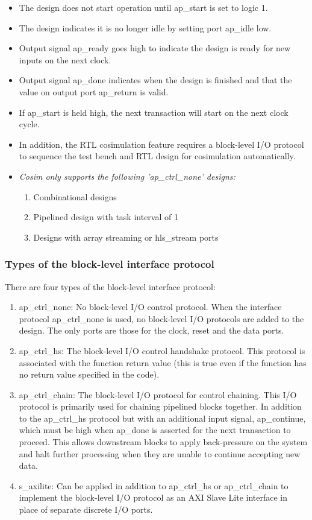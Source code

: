 \begin{itemize}
    \item The design does not start operation until ap\_start is set to logic 1.
    \item The design indicates it is no longer idle by setting port ap\_idle low.
    \item Output signal ap\_ready goes high to indicate the design is ready for new inputs on the next clock.
    \item Output signal ap\_done indicates when the design is finished and that the value on output port ap\_return is valid.
    \item If ap\_start is held high, the next transaction will start on the next clock cycle.
    \item In addition, the RTL cosimulation feature requires a block-level I/O protocol to sequence the test bench and RTL design for cosimulation automatically.
    \item {\it Cosim only supports the following 'ap\_ctrl\_none' designs: \begin{enumerate}
        \item Combinational designs
        \item Pipelined design with task interval of 1
        \item Designs with array streaming or hls\_stream ports
    \end{enumerate}
    }
\end{itemize}

\subsubsection{Types of the block-level interface protocol}
There are four types of the block-level interface protocol:

\begin{enumerate}
    \item ap\_ctrl\_none: No block-level I/O control protocol. When the interface protocol ap\_ctrl\_none is used, no block-level I/O protocols are added to the design. The only ports are those for the clock, reset and the data ports.
    \item ap\_ctrl\_hs: The block-level I/O control handshake protocol. This protocol is associated with the function return value (this is true even if the function has no return value specified in the code).
    \item ap\_ctrl\_chain: The block-level I/O protocol for control chaining. This I/O protocol is primarily used for chaining pipelined blocks together. In addition to the ap\_ctrl\_hs protocol but with an additional input signal, ap\_continue, which must be high when ap\_done is asserted for the next transaction to proceed. This
    allows downstream blocks to apply back-pressure on the system and halt further processing when they are unable to continue accepting new data.
    \item s\_axilite: Can be applied in addition to ap\_ctrl\_hs or ap\_ctrl\_chain to implement the block-level I/O protocol as an AXI Slave Lite interface in place of separate discrete I/O ports.
\end{enumerate}



